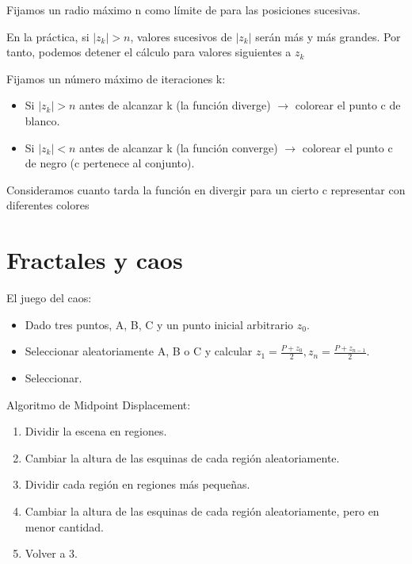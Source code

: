Fijamos un radio máximo n como límite de para las posiciones sucesivas.

En la práctica, si $|z_k| > n$, valores sucesivos de $|z_k|$ serán más y más grandes. Por tanto,
podemos detener el cálculo para valores siguientes a $z_k$

Fijamos un número máximo de iteraciones k:
\begin{itemize}
	\item Si $|z_k| > n$ antes de alcanzar k (la función diverge) $\rightarrow$ colorear el punto c de blanco.
	\item Si $|z_k| < n$ antes de alcanzar k (la función converge) $\rightarrow$ colorear el punto c de negro (c pertenece al conjunto).
\end{itemize}

Consideramos cuanto tarda la función en divergir para un cierto c  representar con diferentes colores

\section{Fractales y caos}
El juego del caos:
\begin{itemize}
	\item Dado tres puntos, A, B, C y un punto inicial arbitrario $z_0$.
	\item Seleccionar aleatoriamente A, B o C y calcular $z_1 = \frac{P+ z_0}{2}, z_n = \frac{P+ z_{n-1}}{2}$.
	\item Seleccionar.
\end{itemize}

Algoritmo de Midpoint Displacement:
\begin{enumerate}
	\item Dividir la escena en regiones.
	\item Cambiar la altura de las esquinas de cada región aleatoriamente.
	\item Dividir cada región en regiones más pequeñas.
	\item Cambiar la altura de las esquinas de cada región aleatoriamente, pero en menor cantidad.
	\item Volver a 3.
\end{enumerate}